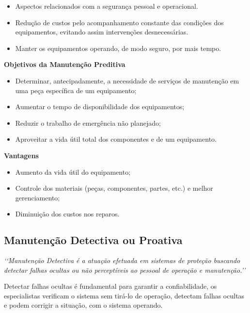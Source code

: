 			\begin{itemize}
				\item Aspectos relacionados com a segurança pessoal e operacional.
				\item Redução de custos pelo acompanhamento constante das condições dos equipamentos, evitando assim intervenções desnecessárias.
				\item Manter os equipamentos operando, de modo seguro, por mais tempo.
			\end{itemize}

		\textbf{Objetivos da Manutenção Preditiva}

			\begin{itemize}
				\item Determinar, antecipadamente, a necessidade de serviços de manutenção em uma peça específica de um equipamento;  
				\item Aumentar o tempo de disponibilidade dos equipamentos;
				\item Reduzir o trabalho de emergência não planejado;  
				\item Aproveitar a vida útil total dos componentes e de um equipamento.
			\end{itemize}

		\textbf{Vantagens}

			\begin{itemize}
				\item Aumento da vida útil do equipamento; 
				\item Controle dos materiais (peças, componentes, partes, etc.) e melhor gerenciamento; 
				\item Diminuição dos custos nos reparos.
			\end{itemize}
		

\subsection{Manutenção Detectiva ou Proativa}

		\emph{\lq\lq Manutenção Detectiva é a atuação efetuada em sistemas de proteção buscando detectar falhas ocultas ou não perceptíveis ao pessoal de operação e manutenção.\rq\rq} \cite{kardecnascif2010}

		Detectar falhas ocultas é fundamental para garantir a confiabilidade, os especialistas verificam o sistema sem tirá-lo de operação, detectam falhas ocultas e podem corrigir a situação, com o sistema operando.

